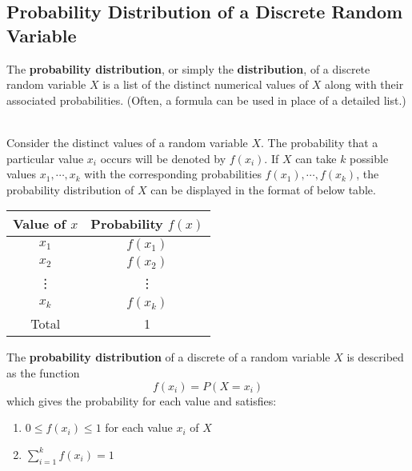 \documentclass[12pt,openany]{book}
\theoremstyle{definition}
\newcommand{\dispsty}{\displaystyle}
\begin{document}
	\subsection{Probability Distribution of a Discrete Random Variable}
	
	\begin{tcolorbox}[colback=white]
		The \textbf{probability distribution}, or simply the \textbf{distribution}, of a discrete random variable $X$ is a list of the distinct numerical values of $X$ along with their associated probabilities. (Often, a formula can be used in place of a detailed list.)
	\end{tcolorbox}\
	\\
	Consider the distinct values of a random variable $X$. The probability that a particular value $x_i$ occurs will be denoted by $f(x_i)$. If $X$ can take $k$ possible values $x_1,\cdots,x_k$ with the corresponding probabilities $f(x_1), \cdots, f(x_k)$, the probability distribution of $X$ can be displayed in the format of below table. \begin{center}\begin{tabular}{c|c}
			\toprule[1.2pt]
			Value of $x$ & Probability $f(x)$ \\
			\hline
			$x_1$ & $f(x_1)$ \\
			$x_2$ & $f(x_2)$ \\
			\vdots & \vdots \\
			$x_k$ & $f(x_k)$ \\
			\hline
			Total & 1 \\
			\bottomrule[1.2pt]
		\end{tabular}
	\end{center}
	
	\begin{tcolorbox}[colback=white]
		The \textbf{probability distribution} of a discrete of a random variable $X$ is described as the function \[
		f(x_i) = P(X=x_i)
		\] which gives the probability for each value and satisfies: \begin{enumerate}
			\item $0\leq f(x_i)\leq 1$ for each value $x_i$ of $X$
			\item \(\dispsty\sum_{i=1}^kf(x_i)=1 \)
		\end{enumerate}
	\end{tcolorbox}
	
\end{document}

